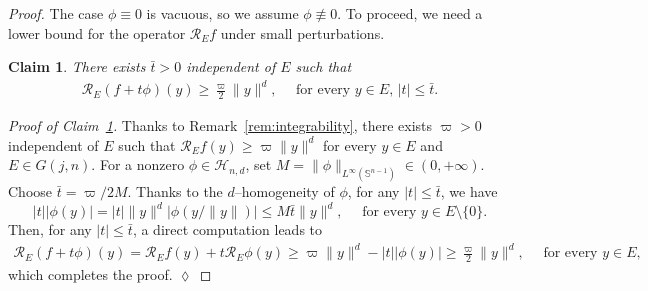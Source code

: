 \documentclass[11pt]{article}
\newtheorem{claim}[theorem]{Claim}
\theoremstyle{definition}
\numberwithin{equation}{section}
\newcommand{\cH}{\mathcal{H}}        %
\newcommand{\Gr}[2]{G(#1,#2)}        %
\begin{document}
\begin{proof}
The case $\phi \equiv 0$ is vacuous, so we assume $\phi \not\equiv 0$. 
To proceed, we need a lower bound for the operator $\mathscr{R}_E f$ under small perturbations.

\begin{claim}\label{claim.gateaux-bound}
There exists $\bar t > 0$ independent of $E$ such that
\begin{align*}
	\mathscr R_E (f + t \phi)(y) \geq \frac{\varpi}{2} \| y \|^d, \quad \text{ for every } y \in E, \, |t| \leq \bar t.
\end{align*}
\end{claim}

\textit{Proof of Claim~\ref{claim.gateaux-bound}.}
Thanks to Remark~\ref{rem:integrability}, there exists $\varpi > 0$ independent of $E$ such that $\mathscr R_E f(y) \geq \varpi \| y \|^d$ for every $y \in E$ and $E \in \Gr{j}{n}$.
For a nonzero $\phi \in \cH_{n, d}$, set $M = \textstyle \| \phi \|_{L^\infty(\mathbb S^{n - 1})} \in (0, + \infty)$.
Choose $\bar t = \varpi/2M$.
Thanks to the $d$--homogeneity of $\phi$, for any $|t| \leq \bar t$, we have
\[
	|t| |\phi(y)| = |t| \| y \|^d |\phi(y / \| y \|)| \leq M \bar t \| y \|^d, \quad \text{ for every } y \in E \setminus \{ 0 \}.
\]
Then, for any $|t| \leq \bar t$, a direct computation leads to
\begin{align*}
	\mathscr R_E (f + t \phi)(y) = \mathscr R_E f(y) + t \mathscr R_E \phi(y) \geq \varpi \| y \|^d - |t| |\phi(y)| \geq \frac{\varpi}{2} \| y \|^d, \quad \text{ for every } y \in E,
\end{align*}
which completes the proof. \hfill  $\lozenge$


\end{proof}
\end{document}

